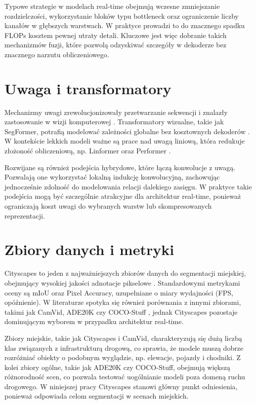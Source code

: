 \documentclass[12pt,oneside,a4paper]{report}
\begin{document}
Typowe strategie w modelach real-time obejmują wczesne zmniejszanie rozdzielczości,
wykorzystanie bloków typu bottleneck oraz ograniczenie liczby kanałów w głębszych
warstwach. W praktyce prowadzi to do znacznego spadku FLOPs kosztem pewnej utraty
detali. Kluczowe jest więc dobranie takich mechanizmów fuzji, które pozwolą
odzyskiwać szczegóły w dekoderze bez znacznego narzutu obliczeniowego.

\section{Uwaga i transformatory}
Mechanizmy uwagi zrewolucjonizowały przetwarzanie sekwencji i znalazły zastosowanie
w wizji komputerowej \parencite{vaswani2017attention,dosovitskiy2020vit}.
Transformatory wizualne, takie jak SegFormer, potrafią modelować zależności
globalne bez kosztownych dekoderów \parencite{xie2021segformer}.
W kontekście lekkich modeli ważne są prace nad uwagą liniową, która redukuje
złożoność obliczeniową, np. Linformer oraz Performer
\parencite{wang2020linformer,choromanski2020performer}.

Rozwijane są również podejścia hybrydowe, które łączą konwolucje z uwagą.
Pozwalają one wykorzystać lokalną indukcję konwolucyjną, zachowując jednocześnie
zdolność do modelowania relacji dalekiego zasięgu. W praktyce takie podejścia
mogą być szczególnie atrakcyjne dla architektur real-time, ponieważ ograniczają
koszt uwagi do wybranych warstw lub skompresowanych reprezentacji.

\section{Zbiory danych i metryki}
Cityscapes to jeden z najważniejszych zbiorów danych do segmentacji miejskiej,
obejmujący wysokiej jakości adnotacje pikselowe
\parencite{cordts2016cityscapes}. Standardowymi metrykami oceny są mIoU oraz
Pixel Accuracy, uzupełniane o miary wydajności (FPS, opóźnienie).
W literaturze spotyka się również porównania z innymi zbiorami, takimi jak
CamVid, ADE20K czy COCO-Stuff \parencite{brostow2008camvid,zhou2017ade20k,caesar2018cocostuff},
jednak Cityscapes pozostaje dominującym wyborem w przypadku architektur real-time.

Zbiory miejskie, takie jak Cityscapes i CamVid, charakteryzują się dużą liczbą
klas związanych z infrastrukturą drogową, co sprawia, że modele muszą dobrze
rozróżniać obiekty o podobnym wyglądzie, np. elewacje, pojazdy i chodniki.
Z kolei zbiory ogólne, takie jak ADE20K czy COCO-Stuff, obejmują większą
różnorodność scen, co pozwala testować uogólnianie modeli poza domeną ruchu
drogowego. W niniejszej pracy Cityscapes stanowi główny punkt odniesienia,
ponieważ odpowiada celom segmentacji w scenach miejskich.
\end{document}
